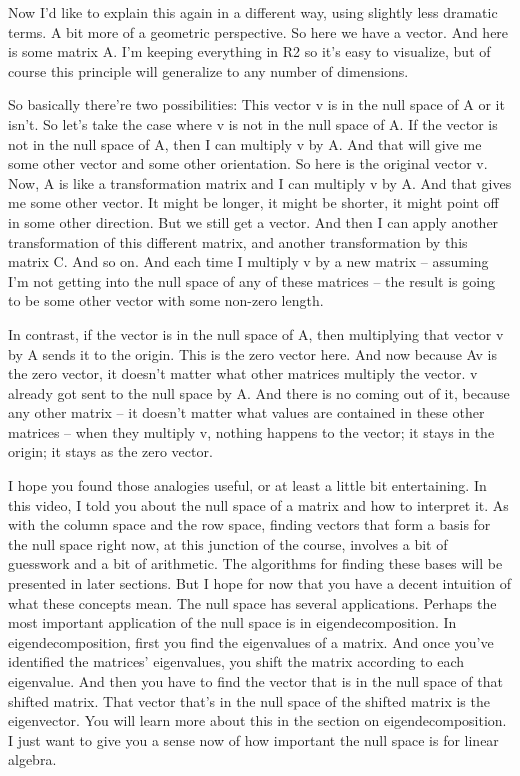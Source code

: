 \documentclass[fleqn,10pt]{olplainarticle}
\theoremstyle{definition}
\theoremstyle{remark}
\begin{document}
Now I'd like to explain this again in a different way, using slightly less dramatic terms. A bit more of a geometric perspective. So here we have a vector. And here is some matrix A. I'm keeping everything in R2 so it's easy to visualize, but of course this principle will generalize to any number of dimensions.

So basically there're two possibilities: This vector v is in the null space of A or it isn't. So let's take the case where v is not in the null space of A. If the vector is not in the null space of A, then I can multiply v by A. And that will give me some other vector and some other orientation. So here is the original vector v. Now, A is like a transformation matrix and I can multiply v by A. And that gives me some other vector. It might be longer, it might be shorter, it might point off in some other direction. But we still get a vector. And then I can apply another transformation of this different matrix, and another transformation by this matrix C. And so on. And each time I multiply v by a new matrix -- assuming I'm not getting into the null space of any of these matrices -- the result is going to be some other vector with some non-zero length.

In contrast, if the vector is in the null space of A, then multiplying that vector v by A sends it to the origin. This is the zero vector here. And now because Av is the zero vector, it doesn't matter what other matrices multiply the vector. v already got sent to the null space by A. And there is no coming out of it, because any other matrix -- it doesn't matter what values are contained in these other matrices -- when they multiply v, nothing happens to the vector; it stays in the origin; it stays as the zero vector.

I hope you found those analogies useful, or at least a little bit entertaining. In this video, I told you about the null space of a matrix and how to interpret it. As with the column space and the row space, finding vectors that form a basis for the null space right now, at this junction of the course, involves a bit of guesswork and a bit of arithmetic. The algorithms for finding these bases will be presented in later sections. But I hope for now that you have a decent intuition of what these concepts mean. The null space has several applications. Perhaps the most important application of the null space is in eigendecomposition. In eigendecomposition, first you find the eigenvalues of a matrix. And once you've identified the matrices' eigenvalues, you shift the matrix according to each eigenvalue. And then you have to find the vector that is in the null space of that shifted matrix. That vector that's in the null space of the shifted matrix is the eigenvector. You will learn more about this in the section on eigendecomposition. I just want to give you a sense now of how important the null space is for linear algebra.
\end{document}
